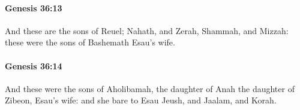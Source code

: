 		\paragraph{Genesis 36:13} %
			\label{GENESIS-36-13}

			And these are the sons of Reuel; Nahath, and Zerah, Shammah, and Mizzah: these were the sons of Bashemath Esau's wife.


		\paragraph{Genesis 36:14} %
			\label{GENESIS-36-14}

			And these were the sons of Aholibamah, the daughter of Anah the daughter of Zibeon, Esau's wife: and she bare to Esau Jeush, and Jaalam, and Korah.


